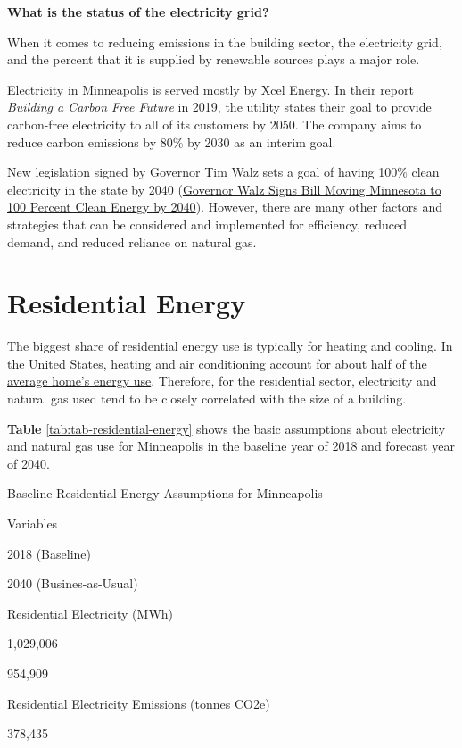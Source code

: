 \documentclass[
]{book}
\begin{document}
\textbf{What is the status of the electricity grid?}

When it comes to reducing emissions in the building sector, the electricity grid, and the percent that it is supplied by renewable sources plays a major role.

Electricity in Minneapolis is served mostly by Xcel Energy. In their report \emph{Building a Carbon Free Future} in 2019, the utility states their goal to provide carbon-free electricity to all of its customers by 2050. The company aims to reduce carbon emissions by 80\% by 2030 as an interim goal.

New legislation signed by Governor Tim Walz sets a goal of having 100\% clean electricity in the state by 2040 (\href{https://mn.gov/commerce/news/?id=17-563384}{Governor Walz Signs Bill Moving Minnesota to 100 Percent Clean Energy by 2040}). However, there are many other factors and strategies that can be considered and implemented for efficiency, reduced demand, and reduced reliance on natural gas.

\hypertarget{residential-energy}{%
\section{Residential Energy}\label{residential-energy}}

The biggest share of residential energy use is typically for heating and cooling. In the United States, heating and air conditioning account for \href{https://www.eia.gov/energyexplained/use-of-energy/homes.php}{about half of the average home's energy use}. Therefore, for the residential sector, electricity and natural gas used tend to be closely correlated with the size of a building.

\textbf{Table} \ref{tab:tab-residential-energy} shows the basic assumptions about electricity and natural gas use for Minneapolis in the baseline year of 2018 and forecast year of 2040.

\label{tab:tab-residential-energy}Baseline Residential Energy Assumptions for Minneapolis

Variables

2018 (Baseline)

2040 (Busines-as-Usual)

Residential Electricity (MWh)

1,029,006

954,909

Residential Electricity Emissions (tonnes CO2e)

378,435
\end{document}
